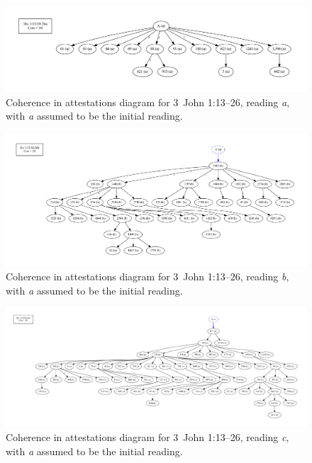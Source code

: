 \documentclass[a4paper, 12pt]{article}
\begin{document}
	\begin{figure}
		\centering
		\includegraphics[scale=0.3333]{../graphics/B25K1V13U24-26Ra-coherence-attestations-1.pdf}
		\caption{Coherence in attestations diagram for 3~John 1:13–26, reading \emph{a}, with \emph{a} assumed to be the initial reading.}
		\label{fig:coherence-a-1}
	\end{figure}
	
	\begin{figure}
		\centering
		\includegraphics[scale=0.3333]{../graphics/B25K1V13U24-26Rb-coherence-attestations-1.pdf}
		\caption{Coherence in attestations diagram for 3~John 1:13–26, reading \emph{b}, with \emph{a} assumed to be the initial reading.}
		\label{fig:coherence-b-1}
	\end{figure}
	
	\begin{figure}
		\centering
		\includegraphics[scale=0.3333]{../graphics/B25K1V13U24-26Rc-coherence-attestations-1.pdf}
		\caption{Coherence in attestations diagram for 3~John 1:13–26, reading \emph{c}, with \emph{a} assumed to be the initial reading.}
		\label{fig:coherence-c-1}
	\end{figure}
	
\end{document}
